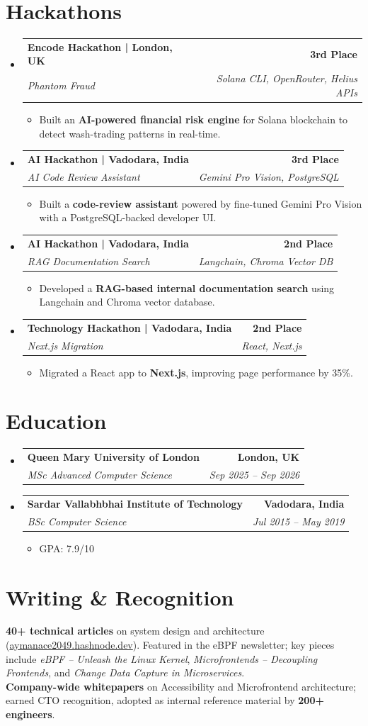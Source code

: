 \documentclass[letterpaper,11pt]{article}
\makeatletter
\newcommand{\resumeItem}[1]{
  \item\small{
    {#1 \vspace{-3pt}}
  }
}
\newcommand{\resumeSubheading}[4]{
  \vspace{-3pt}\item
    \begin{tabular*}{1.0\textwidth}[t]{l@{\extracolsep{\fill}}r}
      \textbf{#1} & \textbf{\small #2} \\
      \textit{\small#3} & \textit{\small #4} \\
    \end{tabular*}\vspace{-7pt}
}
\newcommand{\resumeSubHeadingListStart}{\begin{itemize}[leftmargin=0.0in, label={}]}
\newcommand{\resumeSubHeadingListEnd}{\end{itemize}}
\newcommand{\resumeItemListStart}{\begin{itemize}}
\newcommand{\resumeItemListEnd}{\end{itemize}\vspace{0pt}}
\makeatother
\begin{document}
\section{Hackathons}
\resumeSubHeadingListStart
    \resumeSubheading
      {Encode Hackathon | London, UK}{3rd Place}
      {Phantom Fraud}{Solana CLI, OpenRouter, Helius APIs}
      \resumeItemListStart
        \resumeItem{Built an \textbf{AI-powered financial risk engine} for Solana blockchain to detect wash-trading patterns in real-time.}
      \resumeItemListEnd
    \resumeSubheading
      {AI Hackathon | Vadodara, India}{3rd Place}
      {AI Code Review Assistant}{Gemini Pro Vision, PostgreSQL}
      \resumeItemListStart
        \resumeItem{Built a \textbf{code-review assistant} powered by fine-tuned Gemini Pro Vision with a PostgreSQL-backed developer UI.}
      \resumeItemListEnd
    \resumeSubheading
      {AI Hackathon | Vadodara, India}{2nd Place}
      {RAG Documentation Search}{Langchain, Chroma Vector DB}
      \resumeItemListStart
        \resumeItem{Developed a \textbf{RAG-based internal documentation search} using Langchain and Chroma vector database.}
      \resumeItemListEnd
    \resumeSubheading
      {Technology Hackathon | Vadodara, India}{2nd Place}
      {Next.js Migration}{React, Next.js}
      \resumeItemListStart
        \resumeItem{Migrated a React app to \textbf{Next.js}, improving page performance by 35\%.}
      \resumeItemListEnd
\resumeSubHeadingListEnd

\section{Education}
  \resumeSubHeadingListStart
    \resumeSubheading
      {Queen Mary University of London}{London, UK}
      {MSc Advanced Computer Science}{Sep 2025 -- Sep 2026}
    \resumeSubheading
      {Sardar Vallabhbhai Institute of Technology}{Vadodara, India}
      {BSc Computer Science}{Jul 2015 -- May 2019}
      \resumeItemListStart
        \resumeItem{GPA: 7.9/10}
      \resumeItemListEnd
  \resumeSubHeadingListEnd

\section{Writing \& Recognition}
\small
\textbf{40+ technical articles} on system design and architecture (\href{https://aymanace2049.hashnode.dev}{aymanace2049.hashnode.dev}). Featured in the eBPF newsletter; key pieces include \textit{eBPF -- Unleash the Linux Kernel}, \textit{Microfrontends -- Decoupling Frontends}, and \textit{Change Data Capture in Microservices}. \\[3pt]
\textbf{Company-wide whitepapers} on Accessibility and Microfrontend architecture; earned CTO recognition, adopted as internal reference material by \textbf{200+ engineers}.
\end{document}
